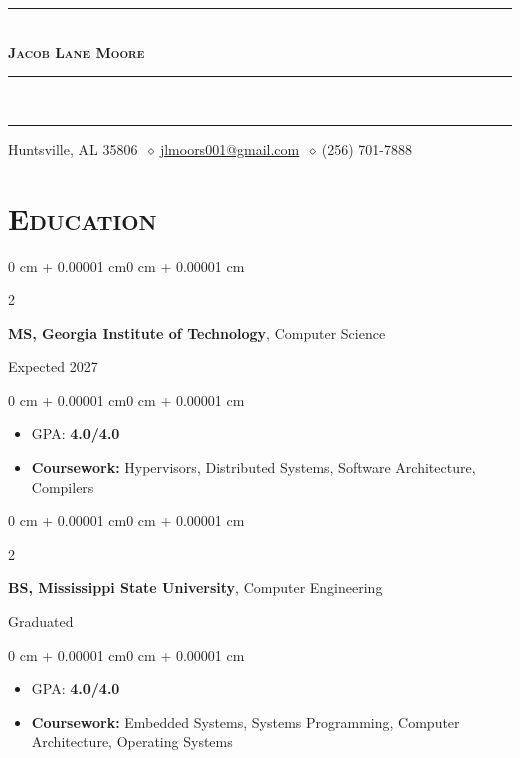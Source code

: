 \documentclass[11pt, letterpaper]{article}
\newenvironment{highlights}{
    \begin{itemize}[
        topsep=0.10 cm,
        parsep=0.10 cm,
        partopsep=0pt,
        itemsep=0pt,
        leftmargin=0.4 cm + 10pt
    ]
}{
    \end{itemize}
}
\newenvironment{onecolentry}{
    \begin{adjustwidth}{0 cm + 0.00001 cm}{0 cm + 0.00001 cm}
}{
    \end{adjustwidth}
}
\newenvironment{twocolentry}[1]{
    \onecolentry
    \def\secondColumn{#1}
    \setcolumnwidth{\fill,4.5cm}
    \begin{paracol}{2}
}{
    \switchcolumn \raggedleft \secondColumn
    \end{paracol}
    \endonecolentry
}
\newcommand{\sep}{\(\ \diamond\ \)}
\begin{document}
\begin{center}

    {\color{primaryColor}\rule{\linewidth}{0.5pt}}\\[0.5em]

    {\fontsize{25pt}{25pt}\selectfont \textbf{\scshape Jacob Lane Moore}}

    {\color{primaryColor}\rule{\linewidth}{0.5pt}}\\[-0.8em]
    {\color{primaryColor}\rule{\linewidth}{2.5pt}}

    \vspace{0.5em}
    Huntsville, AL 35806 \sep \href{mailto:jlmoors001@gmail.com}{jlmoors001@gmail.com} \sep (256) 701-7888

\end{center}


\section{\scshape Education}

\begin{twocolentry}{Expected 2027}
    \textbf{MS, Georgia Institute of Technology}, Computer Science
\end{twocolentry}

\vspace{0.10 cm}
\begin{onecolentry}
\begin{highlights}
    \item GPA: \textbf{4.0/4.0}
    \item \textbf{Coursework:} Hypervisors, Distributed Systems, Software Architecture, Compilers
\end{highlights}
\end{onecolentry}

\vspace{0.3 cm}

\begin{twocolentry}{Graduated}
    \textbf{BS, Mississippi State University}, Computer Engineering
\end{twocolentry}

\vspace{0.10 cm}
\begin{onecolentry}
\begin{highlights}
    \item GPA: \textbf{4.0/4.0}
    \item \textbf{Coursework:} Embedded Systems, Systems Programming, Computer Architecture, Operating Systems
\end{highlights}
\end{onecolentry}
\end{document}
